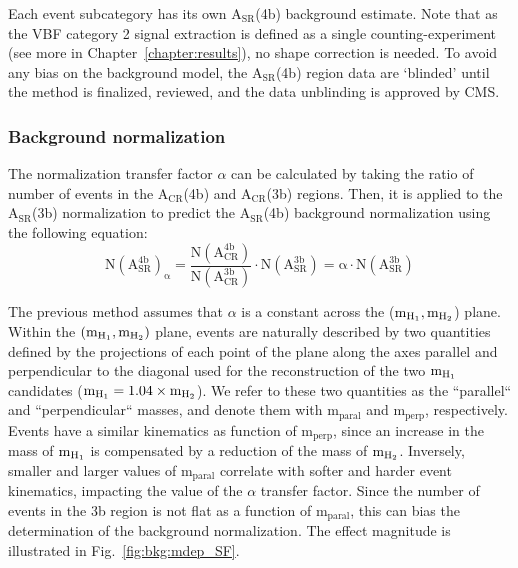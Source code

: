 Each event subcategory has its own $\mathrm{A_{SR}}$(4b) background estimate. Note that as the VBF category 2 signal extraction is defined as a single counting-experiment (see more in Chapter~\ref{chapter:results}), no shape correction is needed. To avoid any bias on the background model, the $\mathrm{A_{SR}}$(4b) region data are `blinded' until the method is finalized, reviewed, and the data unblinding is approved by CMS.

\subsubsection{Background normalization} \label{sec:bkgnorm}
The normalization transfer factor $\alpha$ can be calculated by taking the ratio of number of events in the $\mathrm{A_{CR}}$(4b) and $\mathrm{A_{CR}}$(3b) regions. Then, it is applied to the $\mathrm{A_{SR}}$(3b) normalization to predict the $\mathrm{A_{SR}}$(4b) background normalization using the following equation: \begin{equation}\label{eq:tfconstant}
\mathrm{N(A_{SR}^{4b})_{\alpha} =\frac{ N(A_{CR}^{4b}) }{ N(A_{CR}^{3b}) } \cdot N(A_{SR}^{3b})  = \alpha \cdot N(A_{SR}^{3b}) }
\end{equation}

The previous method assumes that $\alpha$ is a constant across the ($\mathrm{m_{H_{1}}},\mathrm{m_{H_{2}}}$) plane. Within the $(\mathrm{m_{H_{1}}}, \mathrm{m_{H_{2}}})$ plane, events are naturally described by two quantities defined by the projections of each point of the plane along the axes parallel and perpendicular to the diagonal used for the reconstruction of the two $\mathrm{m_{H_{1}}}$ candidates ($\mathrm{m_{H_{1}}} = 1.04 \times \mathrm{m_{H_{2}}}$). We refer to these two quantities as the ``parallel`` and ``perpendicular`` masses, and denote them with $\mathrm{m_{paral}}$ and $\mathrm{m_{perp}}$, respectively. Events have a similar kinematics as function of $\mathrm{m_{perp}}$, since an increase in the mass of $\mathrm{m_{H_{1}}}$ is compensated by a reduction of the mass of $\mathrm{m_{H_{2}}}$. Inversely, smaller and larger values of $\mathrm{m_{paral}}$ correlate with softer and harder event kinematics, impacting the value of the $\alpha$ transfer factor. Since the number of events in the 3b region is not flat as a function of $\mathrm{m_{paral}}$, this can bias the determination of the background normalization. The effect magnitude is illustrated in Fig.~\ref{fig:bkg:mdep_SF}.  


